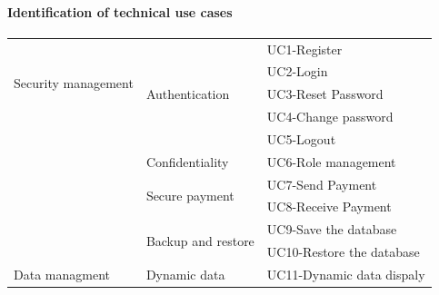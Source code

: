 \paragraph{Identification of technical use cases}

\begin{longtable}{|m{10em}|m{10em}|m{10em}|}\hline
      \multirow{4}{*}{Security management} & \multirow{5}{*}{Authentication}          & UC1-Register                                                    \\\cline{3-3}
                                           &                                          & UC2-Login                                                       \\\cline{3-3}
                                           &                                          & UC3-Reset Password                                              \\\cline{3-3}
                                           &                                          & UC4-Change password                                             \\\cline{3-3}
                                           &                                          & UC5-Logout                                                      \\\cline{2-3}
                                           & \multirow{1}{*}{Confidentiality}         & UC6-Role management                                             \\\cline{2-3}
                                           & \multirow{2}{*}{Secure payment}          & UC7-Send Payment                                                \\\cline{3-3}
                                           &                                          & UC8-Receive Payment                                             \\\cline{2-3}
                                           & \multirow{2}{*}{Backup and restore}      & UC9-Save the database                                           \\\cline{3-3}
                                           &                                          & UC10-Restore the database                                       \\\hline
      \multirow{7}{*}{Data managment}      & \multirow{1}{*}{Dynamic data}            & UC11-Dynamic data dispaly                                       \\\cline{2-3}

\end{longtable}
